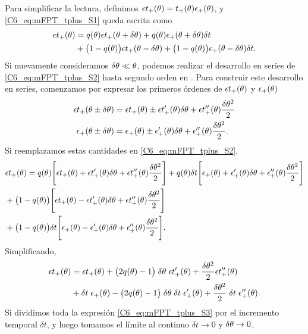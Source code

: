 \documentclass[./main.tex]{subfiles}
\begin{document}
Para simplificar la lectura, definimos  $\epsilon t_+(\theta) =  t_{+}(\theta) \epsilon_{+}(\theta)$, y \ref{C6_eq:mFPT_tplus_S1} queda escrita como
\begin{align}
   \epsilon t_+(\theta) & = q(\theta) \epsilon t_+(\theta + \delta\theta) + q(\theta) \epsilon_{+}(\theta + \delta\theta) \delta t \nonumber \\ & + \big( 1 - q(\theta) \big) \epsilon t_+(\theta - \delta\theta) +  \big( 1 - q(\theta) \big) \epsilon_{+}(\theta - \delta\theta) \delta t.
   \label{C6_eq:mFPT_tplus_S2}
\end{align}
Si nuevamente consideramos $\delta\theta \ll \theta$, podemos realizar el desarrollo en series de \ref{C6_eq:mFPT_tplus_S2} hasta segundo orden en \deltax. Para construir este desarrollo en series, comenzamos por expresar los primeros órdenes de $\epsilon t_+(\theta)$ y $\epsilon_{+}(\theta)$ 
\begin{align}
    \epsilon t_+(\theta \pm \delta\theta) & = \epsilon t_+(\theta) \pm \epsilon t_+'(\theta) \delta\theta + \epsilon t_+''(\theta) \frac{\delta\theta^2}{2} \nonumber \\
    \epsilon_{+}(\theta \pm \delta\theta) & = \epsilon_{+}(\theta) \pm \epsilon_{+}'(\theta) \delta\theta + \epsilon_{+}''(\theta) \frac{\delta\theta^2}{2}.
\end{align}
Si reemplazamos estas cantidades en \ref{C6_eq:mFPT_tplus_S2},
\begin{align}
       & \epsilon t_+(\theta) = q(\theta) \Bigg[  \epsilon t_+(\theta) + \epsilon t_+'(\theta) \delta\theta + \epsilon t_+''(\theta) \frac{\delta\theta^2}{2} \Bigg] + q(\theta) \delta t \Bigg[  \epsilon_{+}(\theta) + \epsilon_{+}'(\theta) \delta\theta + \epsilon_{+}''(\theta) \frac{\delta\theta^2}{2}\Bigg] \nonumber \\ & +  \big( 1 - q(\theta) \big) \Bigg[  \epsilon t_+(\theta) - \epsilon t_+'(\theta) \delta\theta + \epsilon t_+''(\theta) \frac{\delta\theta^2}{2} \Bigg] \nonumber \\ & + \big( 1 - q(\theta) \big) \delta t \Bigg[  \epsilon_{+}(\theta) - \epsilon_{+}'(\theta) \delta\theta + \epsilon_{+}''(\theta) \frac{\delta\theta^2}{2}\Bigg] .
\end{align}
Simplificando,
\begin{align}
        \epsilon t_+(\theta) & = \epsilon t_+(\theta) + \big(2 q(\theta) -1 \big) \; \delta\theta \;  \epsilon t_+'(\theta)  +  \frac{\delta\theta^2}{2}  \epsilon t_+''(\theta) \nonumber \\ & + \delta t \; \epsilon_{+}(\theta)  - \big(2 q(\theta) -1 \big) \; \delta\theta \; \delta t \;  \epsilon_{+}'(\theta) +  \frac{\delta\theta^2}{2} \; \delta t \; \epsilon_{+}''(\theta) .
        \label{C6_eq:mFPT_tplus_S3}
\end{align}
Si dividimos toda la expresión \ref{C6_eq:mFPT_tplus_S3} por el incremento temporal $\delta t$, y luego tomamos el límite al continuo  $\delta t \rightarrow   0 $ y $\delta\theta \rightarrow 0$, 
\end{document}
